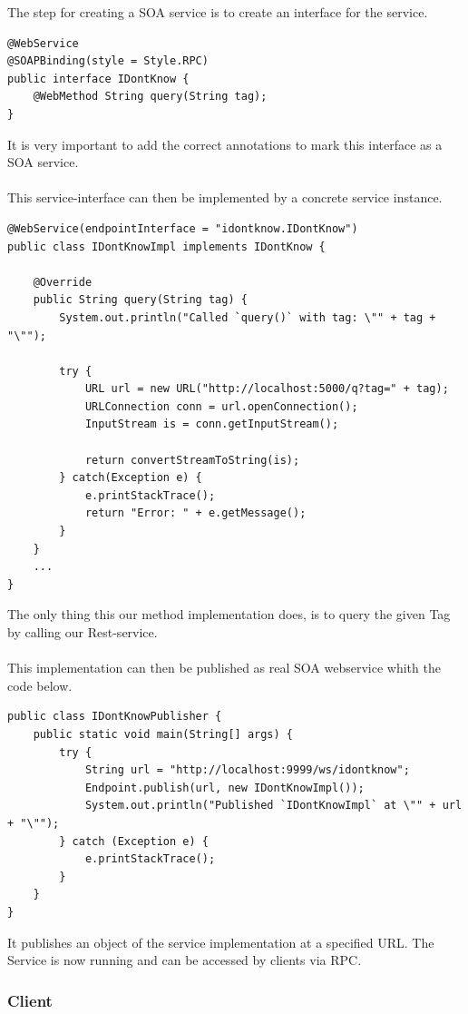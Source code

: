 \documentclass[11pt, a4paper]{article}
\begin{document}
The step for creating a SOA service is to create an interface for the service.

\begin{lstlisting}
@WebService
@SOAPBinding(style = Style.RPC)
public interface IDontKnow {
	@WebMethod String query(String tag);
}
\end{lstlisting}

It is very important to add the correct annotations to mark this interface as a SOA service.
\\\\
This service-interface can then be implemented by a concrete service instance.

\begin{lstlisting}
@WebService(endpointInterface = "idontknow.IDontKnow")
public class IDontKnowImpl implements IDontKnow {

	@Override
	public String query(String tag) {
		System.out.println("Called `query()` with tag: \"" + tag + "\"");
	
		try {
			URL url = new URL("http://localhost:5000/q?tag=" + tag);
			URLConnection conn = url.openConnection();
			InputStream is = conn.getInputStream();

			return convertStreamToString(is);
		} catch(Exception e) {
			e.printStackTrace();
			return "Error: " + e.getMessage();
		}
	}
	...
}
 \end{lstlisting}
 
The only thing this our method implementation does, is to query the given Tag by calling our Rest-service.
\\\\
This implementation can then be published as real SOA webservice whith the code below.

\begin{lstlisting}
public class IDontKnowPublisher {
	public static void main(String[] args) {
		try {
			String url = "http://localhost:9999/ws/idontknow";
			Endpoint.publish(url, new IDontKnowImpl());
			System.out.println("Published `IDontKnowImpl` at \"" + url + "\"");
		} catch (Exception e) {
			e.printStackTrace();
		}
	}
}
\end{lstlisting}

It publishes an object of the service implementation at a specified URL. The Service is now running and can be accessed by clients via RPC.

\subsubsection{Client}
\end{document}
